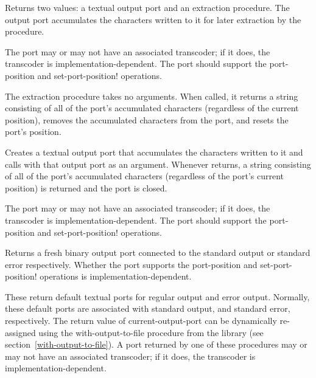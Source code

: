 \begin{entry}{%
}

Returns two values: a textual output port and an extraction procedure.
The output port accumulates the characters written to it for
later extraction by the procedure.

The port may or may not have an associated transcoder; if it does, the
transcoder is implementation-dependent.  The port should support the {\cf
  port-position} and {\cf set-port-position!} operations.

The extraction procedure takes no arguments.
When called, it returns a string consisting of all of the port's
accumulated characters (regardless of the current position),
removes the accumulated characters from the port, and resets
the port's position.
\end{entry}

\begin{entry}{%
}

Creates a textual output port that accumulates the
characters written to it and calls  with that output port
as an argument.  Whenever  returns, a string consisting of all
of the port's accumulated characters (regardless of the port's current
position) is returned and the port is closed.

The port may or may not have an associated transcoder; if it does, the
transcoder is implementation-dependent.  The port should support the
{\cf port-position} and {\cf set-port-position!} operations.
\end{entry}

\begin{entry}{%
}
   
Returns a fresh binary output port connected to the standard output or
standard error respectively.  Whether the port supports the {\cf
  port-position} and {\cf set-port-position!} operations is
implementation-dependent.
\end{entry}

\begin{entry}{%
}
 
These return default textual ports for regular output and error
output.  Normally, these default ports are associated with standard
output, and standard error, respectively.  The return value of {\cf
  current-output-port} can be dynamically re-assigned using the {\cf
  with-output-to-file} procedure from the 
library (see section~\ref{with-output-to-file}).  A port returned by
one of these procedures may or may not have an associated transcoder;
if it does, the transcoder is implementation-dependent.
\end{entry}


